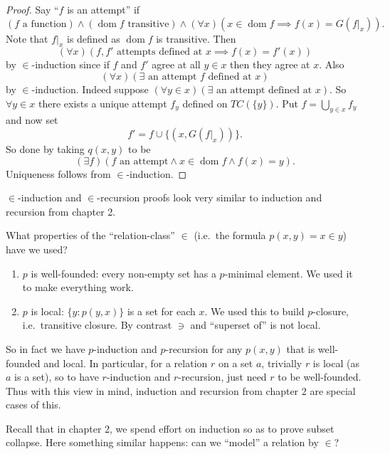 \documentclass[a4paper]{article}
\DeclareMathOperator{\dom}{dom} %
\begin{document}
\begin{proof}
  Say ``\(f\) is an attempt'' if
  \[
    (f \text{ a function}) \land (\dom f \text{ transitive}) \land (\forall x) (x \in \dom f \implies f(x) = G(f|_x)).
  \]
  Note that \(f|_x\) is defined as \(\dom f\) is transitive. Then
  \[
    (\forall x) (f, f' \text{ attempts defined at } x \implies f(x) = f'(x))
  \]
  by \(\in\)-induction since if \(f\) and \(f'\) agree at all \(y \in x\) then they agree at \(x\). Also
  \[
    (\forall x) (\exists \text{ an attempt \(f\) defined at } x)
  \]
  by \(\in\)-induction. Indeed suppose \((\forall y \in x) (\exists \text{ an attempt defined at } x)\). So \(\forall y \in x\) there exists a unique attempt \(f_y\) defined on \(TC(\{y\})\). Put \(f = \bigcup_{y \in x} f_y\) and now set
  \[
    f' = f \cup \{(x, G(f|_x))\}.
  \]
  So done by taking \(q(x, y)\) to be
  \[
    (\exists f) (f \text{ an attempt} \land x \in \dom f \land f(x) = y).
  \]
  Uniqueness follows from \(\in\)-induction.
\end{proof}

\begin{note}
  \(\in\)-induction and \(\in\)-recursion proofs look very similar to induction and recursion from chapter 2.
\end{note}

What properties of the ``relation-class'' \(\in\) (i.e.\ the formula \(p(x, y) = x \in y\)) have we used?

\begin{enumerate}
\item \(p\) is well-founded: every non-empty set has a \(p\)-minimal element. We used it to make everything work.
\item \(p\) is local: \(\{y: p(y, x)\}\) is a set for each \(x\). We used this to build \(p\)-closure, i.e.\ transitive closure. By contrast \(\ni\) and ``superset of'' is not local.
\end{enumerate}

So in fact we have \(p\)-induction and \(p\)-recursion for any \(p(x, y)\) that is well-founded and local. In particular, for a relation \(r\) on a set \(a\), trivially \(r\) is local (as \(a\) is a set), so to have \(r\)-induction and \(r\)-recursion, just need \(r\) to be well-founded. Thus with this view in mind, induction and recursion from chapter 2 are special cases of this.

Recall that in chapter 2, we spend effort on induction so as to prove subset collapse. Here something similar happens: can we ``model'' a relation by \(\in\)?
\end{document}
